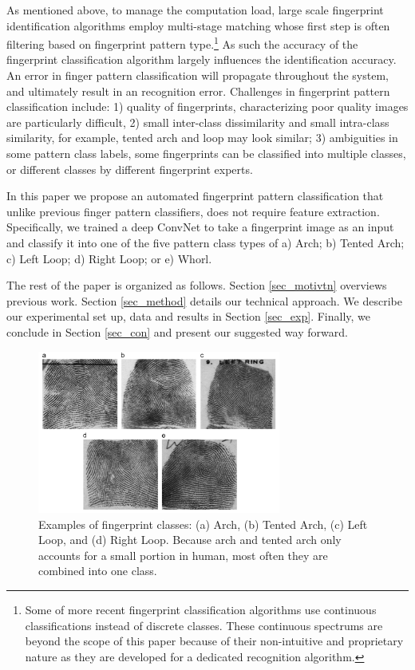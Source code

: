 As mentioned above, to manage the computation load, large scale fingerprint identification algorithms employ multi-stage matching whose first step is often filtering based on fingerprint pattern type.\footnote{Some of more recent fingerprint classification algorithms use continuous classifications instead of discrete classes. These continuous spectrums are beyond the scope of this paper because of their non-intuitive and proprietary nature as they are developed for a dedicated recognition algorithm.} As such the accuracy of the fingerprint classification algorithm largely influences the identification accuracy. An error in finger pattern classification will propagate throughout the system, and ultimately result in an recognition error. 
Challenges in fingerprint pattern classification include: 
%
1) quality of fingerprints, characterizing poor quality images are particularly difficult,
%
2) small inter-class dissimilarity and small intra-class similarity, for example, tented arch and loop may look similar; 
%
3) ambiguities in some pattern class labels, some fingerprints can be classified into multiple classes, or different classes by different fingerprint experts.

In this paper we propose an automated fingerprint pattern classification that unlike previous finger pattern classifiers, does not require feature extraction.  Specifically, we trained a deep ConvNet  to take a fingerprint image as an input and classify it into one of the five pattern class types of a) Arch; b) Tented Arch; c) Left Loop; d) Right Loop; or e) Whorl. 

The rest of the paper is organized as follows.  Section \ref{sec_motivtn} overviews previous work. 
Section \ref{sec_method} details our technical approach. 
We describe our experimental set up, data and results in Section \ref{sec_exp}.
Finally, we conclude in Section \ref{sec_con} and present our suggested way forward.

\begin{figure}[!ht]
	\begin{center}
		\includegraphics[width=8cm]{fig/Fingerprint_classes.png}
	\end{center}
	\caption{Examples of fingerprint classes\cite{cao2013fingerprint}: (a) Arch, (b) Tented Arch,  (c) Left Loop, and  (d) Right Loop.  Because arch and tented arch only accounts for a small portion in human, most often they are combined into one class.} 
	\label{fig.fingerprint_classes}
\end{figure}

